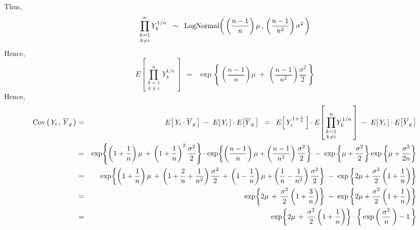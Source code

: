 Thus,
\begin{equation*}
\underset{k \neq i}{\prod_{k=1}^{n}}\,Y_{k}^{1/n}
\;\;\sim\;\;
\textnormal{LogNormal}
\!\left(\,\left(\dfrac{n-1}{n}\right)\mu\,,\,\left(\dfrac{n-1}{n^{2}}\right)\sigma^{2}\,\right)
\end{equation*}
Hence,
\begin{equation*}
E\!\left[\,\underset{k \neq i}{\prod_{k=1}^{n}}\,Y_{k}^{1/n}\,\right]
\;\;=\;\;
\exp
\!\left\{\,
\left(\dfrac{n-1}{n}\right)\mu\;+\;\left(\dfrac{n-1}{n^{2}}\right)\dfrac{\sigma^{2}}{2}
\,\right\}
\end{equation*}
Hence,
\begin{eqnarray*}
          \textnormal{Cov}\left(\, Y_{i} \,,\, \overline{Y}_{g} \,\right)
&=&       E\!\left[\,Y_{i}\cdot \overline{Y}_{g}\,\right]
          \;-\;
          E\!\left[\,Y_{i}\,\right]\cdot E\!\left[\overline{Y}_{g}\,\right]
\;\;=\;\; E\!\left[\,Y_{i}^{1+\frac{1}{n}}\,\right]
          \cdot
          E\!\left[\,\underset{k \neq i}{\prod_{k=1}^{n}}Y_{k}^{1/n} \,\right]
          \;-\;
          E\!\left[\,Y_{i}\,\right]\cdot E\!\left[\overline{Y}_{g}\,\right] \\
&=&       \exp\!\left\{
          \left(1+\frac{1}{n}\right)\mu
          \,+\,
          \left(1+\frac{1}{n}\right)^{2}\dfrac{\sigma^{2}}{2}
          \right\}
          \cdot
          \exp
          \!\left\{
          \left(\dfrac{n-1}{n}\right)\mu+\left(\dfrac{n-1}{n^{2}}\right)\dfrac{\sigma^{2}}{2}
          \right\}
          \; - \;
          \exp\left\{\mu + \frac{\sigma^{2}}{2} \right\}
          \exp\left\{\mu + \frac{\sigma^{2}}{2n}\right\} \\
&=&       \exp\!\left\{
          \left(1+\frac{1}{n}\right)\mu
          \,+\,
          \left(1+\frac{2}{n}+\dfrac{1}{n^{2}}\right)\dfrac{\sigma^{2}}{2}
          \,+\,
          \left(1-\dfrac{1}{n}\right)\mu+\left(\dfrac{1}{n}-\dfrac{1}{n^{2}}\right)\dfrac{\sigma^{2}}{2}
          \right\}
          \; - \;
          \exp\left\{2\mu + \frac{\sigma^{2}}{2}\left(1+\frac{1}{n}\right) \right\} \\
&=&       \exp\!\left\{
          2\mu \,+\,
          \dfrac{\sigma^{2}}{2}
          \left(1+\frac{3}{n}\right)
          \right\}
          \; - \;
          \exp\left\{2\mu + \frac{\sigma^{2}}{2}\left(1+\frac{1}{n}\right) \right\} \\
&=&       \exp\!\left\{
          2\mu \,+\,
          \dfrac{\sigma^{2}}{2}
          \left(1+\frac{1}{n}\right)
          \right\}
          \cdot
          \left\{\,\exp\left(\,\dfrac{\sigma^{2}}{n}\,\right)-1\,\right\} \\
\end{eqnarray*}
